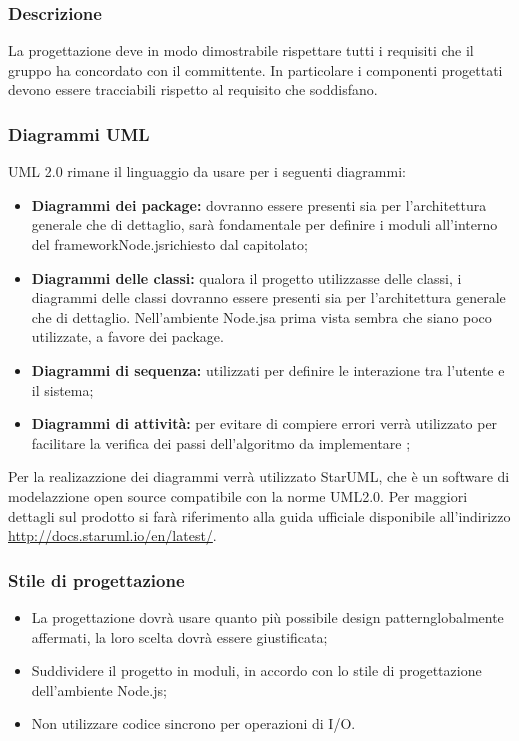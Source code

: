 \documentclass[a4paper,11pt]{article}
\begin{document}
			\subsubsection{Descrizione}
			La progettazione deve in modo dimostrabile rispettare tutti i requisiti che il gruppo ha concordato con il committente. In particolare i componenti progettati devono essere tracciabili rispetto al requisito che soddisfano.
			\subsubsection{Diagrammi UML}
			UML 2.0 rimane il linguaggio da usare per i seguenti diagrammi:
			\begin{itemize}
			\item\textbf{Diagrammi dei package\addglos:} dovranno essere presenti sia per l'architettura generale che di dettaglio, sarà fondamentale per definire i moduli all'interno del framework\addglos Node.js\addglos richiesto dal capitolato;
			\item\textbf{Diagrammi delle classi:} qualora il progetto utilizzasse delle classi, i diagrammi delle classi dovranno essere presenti sia per l'architettura generale che di dettaglio. Nell'ambiente Node.js\addglos a prima vista sembra che siano poco utilizzate, a favore dei package\addglos.
			\item\textbf{Diagrammi di sequenza:} utilizzati per definire le interazione tra l'utente e il sistema;
			\item\textbf{Diagrammi di attività:} per evitare di compiere errori verrà utilizzato per facilitare la verifica dei passi dell'algoritmo da implementare ;
			\end{itemize}
			Per la realizazzione dei diagrammi verrà utilizzato StarUML\addglos, che è un software di modelazzione open source compatibile con la norme UML2.0. Per maggiori dettagli sul prodotto si farà riferimento alla guida ufficiale disponibile all'indirizzo \url{http://docs.staruml.io/en/latest/}.
			\subsubsection{Stile di progettazione}
				\begin{itemize}
				\item La progettazione dovrà usare quanto più possibile design pattern\addglos globalmente affermati, la loro scelta dovrà essere giustificata;
				\item Suddividere il progetto in moduli, in accordo con lo stile di progettazione dell'ambiente Node.js\addglos;
				\item Non utilizzare codice sincrono per operazioni di I/O\addglos.
				
				\end{itemize}
			
\end{document}
